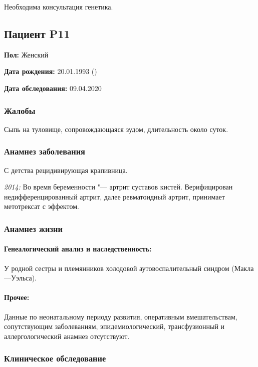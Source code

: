 \documentclass[a4paper,14pt]{extarticle}
\newcommand{\mg}{мг}
\newcommand{\pdate}[1]{\emph{#1:} }
\begin{document}
Необходима консультация генетика.

\newpage
\subsection*{Пациент P11}

\textbf{Пол:} Женский

\textbf{Дата рождения:} 20.01.1993 ()

\textbf{Дата обследования:} 09.04.2020

\subsubsection*{Жалобы}

Сыпь на туловище, сопровождающаяся зудом, длительность около суток.

\subsubsection*{Анамнез заболевания}

С детства рецидивирующая крапивница.

\pdate{2014} Во время беременности "--- артрит суставов кистей. Верифицирован недифференцированный артрит, далее ревматоидный артрит, принимает метотрексат \numprint[\mg]{15} с эффектом.

\subsubsection*{Анамнез жизни}

\paragraph{Генеалогический анализ и наследственность:} У родной сестры и племянников холодовой аутовоспалительный синдром (Макла---Уэльса).

\paragraph{Прочее:} Данные по неонатальному периоду развития, оперативным вмешательствам, сопутствующим заболеваниям, эпидемиологический, трансфузионный и аллергологический анамнез отсутствуют.

\subsubsection*{Клиническое обследование}
\end{document}
